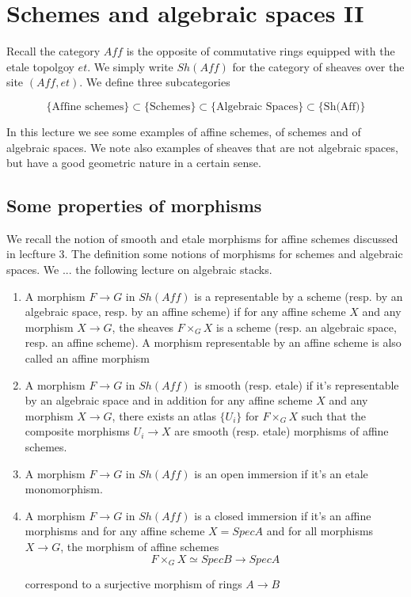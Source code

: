 \documentclass[../main.tex]{subfiles}
\begin{document}
\setcounter{chapter}{4}

\chapter{Schemes and algebraic spaces II}

Recall the category $Aff$ is the opposite of commutative rings equipped with the etale topolgoy $et$. We simply write $Sh(Aff)$ for the category of sheaves over the site $(Aff, et)$. We define three subcategories

\[
    \{\text{Affine schemes}\}
    \subset
    \{\text{Schemes}\}
    \subset
    \{\text{Algebraic Spaces}\}
    \subset
    \{\text{Sh(Aff)}\}
\]

In this lecture we see some examples of affine schemes, of schemes and of algebraic spaces. We note also examples of sheaves that are not algebraic spaces, but have a good geometric nature in a certain sense.

\section{Some properties of morphisms}

We recall the notion of smooth and etale morphisms for affine schemes discussed in lecfture 3. The definition some notions of morphisms for schemes and algebraic spaces. We ... the following lecture on algebraic stacks.

\begin{defn}
    \begin{enumerate}
        \item A morphism $F \to G$ in $Sh(Aff)$ is a representable by a scheme (resp. by an algebraic space, resp. by an affine scheme) if for any affine scheme $X$ and any morphism $X \to G$, the sheaves $F \times_GX$ is a scheme (resp. an algebraic space, resp. an affine scheme). A morphism representable by an affine scheme is also called an affine morphism

        \item A morphism $F \to G$ in $Sh(Aff)$ is smooth (resp. etale) if it's representable by an algebraic space and in addition for any affine scheme $X$ and any morphism $X \to G$, there exists an atlas $\{U_i\}$ for $F \times_G X$ such that the composite morphisms $U_i \to X$ are smooth (resp. etale) morphisms of affine schemes.

        \item A morphism $F \to G$ in $Sh(Aff)$ is an open immersion if it's an etale monomorphism.

        \item A morphism $F \to G$ in $Sh(Aff)$ is a closed immersion if it's an affine morphisms and for any affine scheme $X = Spec A$ and for all morphisms $X \to G$, the morphism of affine schemes
        \[
            F \times_G X \simeq Spec B \to Spec A
        \]

        correspond to a surjective morphism of rings $A \to B$
    \end{enumerate}
\end{defn}
\end{document}
